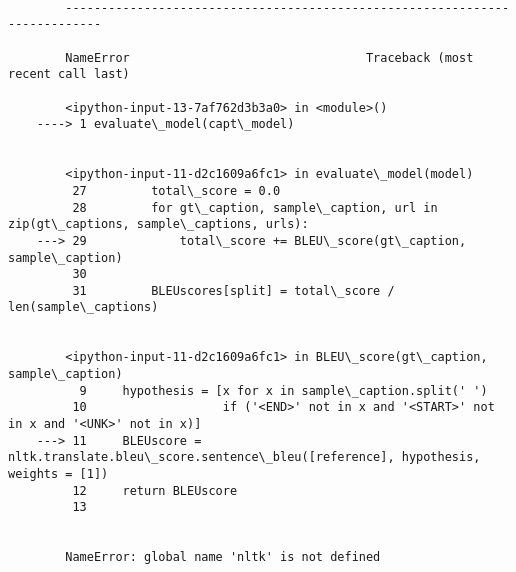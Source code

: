 \documentclass[11pt]{article}
\begin{document}
    \begin{Verbatim}[commandchars=\\\{\}]

        ---------------------------------------------------------------------------

        NameError                                 Traceback (most recent call last)

        <ipython-input-13-7af762d3b3a0> in <module>()
    ----> 1 evaluate\_model(capt\_model)
    

        <ipython-input-11-d2c1609a6fc1> in evaluate\_model(model)
         27         total\_score = 0.0
         28         for gt\_caption, sample\_caption, url in zip(gt\_captions, sample\_captions, urls):
    ---> 29             total\_score += BLEU\_score(gt\_caption, sample\_caption)
         30 
         31         BLEUscores[split] = total\_score / len(sample\_captions)


        <ipython-input-11-d2c1609a6fc1> in BLEU\_score(gt\_caption, sample\_caption)
          9     hypothesis = [x for x in sample\_caption.split(' ') 
         10                   if ('<END>' not in x and '<START>' not in x and '<UNK>' not in x)]
    ---> 11     BLEUscore = nltk.translate.bleu\_score.sentence\_bleu([reference], hypothesis, weights = [1])
         12     return BLEUscore
         13 


        NameError: global name 'nltk' is not defined

    \end{Verbatim}


    
    
    
    
\end{document}
